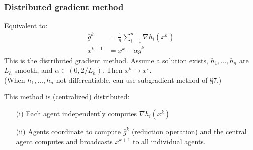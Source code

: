 \documentclass[10pt,mathserif]{beamer}
\begin{document}
\begin{frame}
\frametitle{Distributed gradient method}
Equivalent to:
\begin{align*}
\bar{g}^k&=\frac{1}{n}\sum^n_{i=1}\nabla h_i(x^k)\\
x^{k+1}&=x^{k}-\alpha \bar{g}^k
\end{align*}
This is the distributed gradient method.
Assume a solution exists, $h_1,\dots,h_n$ are $L_h$-smooth, and $\alpha\in (0,2/L_h)$. Then $x^k\rightarrow x^\star$.\\
(When $h_1,\dots,h_n$  not differentiable, can use subgradient method of \S7.)
\pause\vspace{0.2in}

This method is (centralized) distributed: 
\begin{itemize}
\item[(i)] Each agent independently computes $\nabla h_i(x^k)$
\item[(ii)] Agents coordinate to compute $\bar{g}^k$ (reduction operation) and the central agent computes and broadcasts $x^{k+1}$ to all individual agents.
\end{itemize}
\end{frame}
\end{document}
